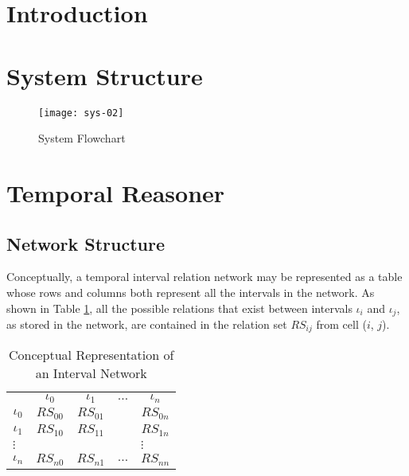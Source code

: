 \documentclass[11pt]{report}
\begin{document}
    \section{Introduction}

    \section{System Structure}

      \begin{figure}[[tbhp]
        \begin{center}
          \texttt{[image: sys-02]}
          \caption{System Flowchart}
          \label{fig-sysflow-2}
        \end{center}
      \end{figure}

    \section{Temporal Reasoner}

      \subsection{Network Structure}

        Conceptually, a temporal interval relation network may be represented
        as a table whose rows and columns both represent all the intervals
        in the network. As shown in Table \ref{table-cons-int-net}, all the
        possible relations that exist between intervals $\iota_i$ and
        $\iota_j$, as stored in the network, are contained in the relation set
        $RS_{ij}$ from cell ($i$, $j$).

        \begin{table}[tbhp]
          \begin{center}
            \begin{tabular}[t]{|c|c|c|c|c|}
              \cline{1-3}
              \cline{5-5}
              & $\iota_0$ & $\iota_1$ & $\ldots$ & $\iota_n$ \\
              \cline{1-3}
              \cline{5-5}
              $\iota_0$ & $RS_{00}$ & $RS_{01}$ & & $RS_{0n}$ \\
              \cline{1-3}
              \cline{5-5}
              $\iota_1$ & $RS_{10}$ & $RS_{11}$ & & $RS_{1n}$ \\
              \cline{1-3}
              \cline{5-5}
              \multicolumn{4}{l}{$\vdots$} & \multicolumn{1}{l}{$\vdots$} \\
              \cline{1-3}
              \cline{5-5}
              $\iota_n$ & $RS_{n0}$ & $RS_{n1}$ & $\ldots$ & $RS_{nn}$ \\
              \cline{1-3}
              \cline{5-5}
            \end{tabular}
          \end{center}
          \caption[]{Conceptual Representation of an Interval Network}
          \label{table-cons-int-net}
        \end{table}
\end{document}
